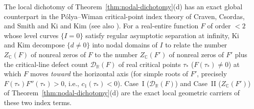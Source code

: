 \documentclass[11pt,reqno]{amsart}
\theoremstyle{definition}
\theoremstyle{remark}
\numberwithin{equation}{section}
\begin{document}
The local dichotomy of Theorem~\ref{thm:nodal-dichotomy}(d) has an exact global counterpart in the P\'{o}lya--Wiman critical-point index theory of Craven, Csordas, and Smith \cite{CravenCsordasSmith1987} and Ki and Kim \cite{KiKim2000} (see also \cite{BombieriGhosh2011}). For a real-entire function $F$ of order $<2$ whose level curves $\{I=0\}$ satisfy regular asymptotic separation at infinity, Ki and Kim \cite{KiKim2000} decompose $\{d\ne 0\}$ into nodal domains of $I$ to relate the number $Z_{\mathbb{C}}(F)$ of nonreal zeros of $F$ to the number $Z_{\mathbb{C}}(F')$ of nonreal zeros of $F'$ plus the critical-line defect count $\mathcal{D}_{\mathbb{R}}(F)$ of real critical points $\tau_*$ ($F(\tau_*)\ne 0$) at which $F$ moves \emph{toward} the horizontal axis (for simple roots of $F'$, precisely $F(\tau_*)F''(\tau_*) > 0$, i.e., $c_1(\tau_*) < 0$). Case~I ($\mathcal{D}_{\mathbb{R}}(F)$) and Case~II ($Z_{\mathbb{C}}(F')$) of Theorem~\ref{thm:nodal-dichotomy}(d) are the exact local geometric carriers of these two index terms.
\end{document}
